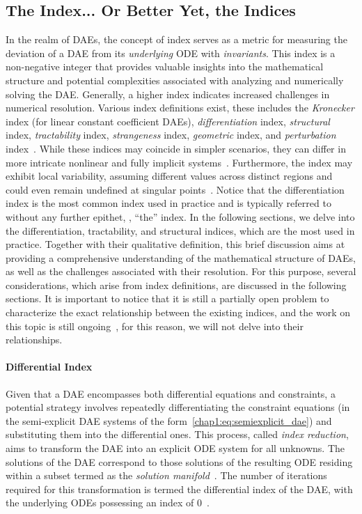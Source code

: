 \subsection{The Index... Or Better Yet, the Indices}

In the realm of \acp{DAE}, the concept of index serves as a metric for measuring the deviation of a \ac{DAE} from its \emph{underlying} \ac{ODE} with \emph{invariants}. This index is a non-negative integer that provides valuable insights into the mathematical structure and potential complexities associated with analyzing and numerically solving the \ac{DAE}. Generally, a higher index indicates increased challenges in numerical resolution. Various index definitions exist, these includes the \emph{Kronecker} index (for linear constant coefficient \acp{DAE}), \emph{differentiation} index, \emph{structural} index, \emph{tractability} index, \emph{strangeness} index, \emph{geometric} index, and \emph{perturbation} index~\cite{mehrmann2015index}. While these indices may coincide in simpler scenarios, they can differ in more intricate nonlinear and fully implicit systems~\cite{lamour2012detecting}. Furthermore, the index may exhibit local variability, assuming different values across distinct regions and could even remain undefined at singular points~\cite{lamour2012detecting}. Notice that the differentiation index is the most common index used in practice and is typically referred to without any further epithet, \ie{}, ``the'' index. In the following sections, we delve into the differentiation, tractability, and structural indices, which are the most used in practice. Together with their qualitative definition, this brief discussion aims at providing a comprehensive understanding of the mathematical structure of \acp{DAE}, as well as the challenges associated with their resolution. For this purpose, several considerations, which arise from index definitions, are discussed in the following sections. It is important to notice that it is still a partially open problem to characterize the exact relationship between the existing indices, and the work on this topic is still ongoing~\cite{mehrmann2015index}, for this reason, we will not delve into their relationships.

\paragraph{Differential Index}

Given that a \ac{DAE} encompasses both differential equations and constraints, a potential strategy involves repeatedly differentiating the constraint equations (in the semi-explicit \ac{DAE} systems of the form~\eqref{chap1:eq:semiexplicit_dae}) and substituting them into the differential ones. This process, called \emph{index reduction}, aims to transform the \ac{DAE} into an explicit \ac{ODE} system for all unknowns. The solutions of the \ac{DAE} correspond to those solutions of the resulting \ac{ODE} residing within a subset termed as the \emph{solution manifold}~\cite{rheinboldt1984differential}. The number of iterations required for this transformation is termed the differential index of the \ac{DAE}, with the underlying \acp{ODE} possessing an index of 0~\cite{mehrmann2015index}.

